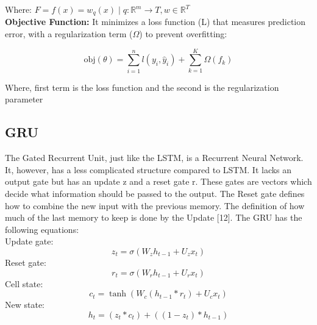 \documentclass{ieeeojies}
\begin{document}
Where: $F = {f(x) = w_q(x) \mid q : \mathbb{R}^m \to T, w \in \mathbb{R}^T}$\\

\textbf{Objective Function:}
It minimizes a loss function (L) that measures prediction error, with a regularization term ($\Omega$) to prevent overfitting:\cite{geekXGboost}

\begin{equation*}
\text{obj}(\theta) = \sum_{i=1}^n l(y_i, \hat{y}_i) + \sum_{k=1}^K \Omega(f_k)
\end{equation*}

Where, first term is the loss function and the second is the regularization parameter\\

\subsection{GRU}
The Gated Recurrent Unit, just like the LSTM, is a Recurrent
Neural Network. It, however, has a less complicated structure
compared to LSTM. It lacks an output gate but has an update z
and a reset gate r. These gates are vectors which decide what
information should be passed to the output. 
The Reset gate defines how to combine the new input with the
previous memory. The definition of how much of the last memory
to keep is done by the Update [12]. The GRU has the following
equations:\cite{Yamak}
\\
Update gate:
\begin{equation}
z_t = \sigma(W_z h_{t-1} + U_z x_t)
\end{equation}
Reset gate:
\begin{equation}
r_t = \sigma(W_r h_{t-1} + U_r x_t)
\end{equation}
Cell state:
\begin{equation}
c_t = \tanh(W_c (h_{t-1} \ast r_t) + U_c x_t)
\end{equation}
New state:
\begin{equation}
h_t = (z_t \ast c_t) + ((1 - z_t) \ast h_{t-1})
\end{equation}
\end{document}
